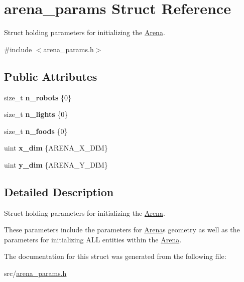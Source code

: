 \hypertarget{structarena__params}{}\section{arena\+\_\+params Struct Reference}
\label{structarena__params}


Struct holding parameters for initializing the \hyperlink{classArena}{Arena}.  




{\ttfamily \#include $<$arena\+\_\+params.\+h$>$}

\subsection*{Public Attributes}
\begin{DoxyCompactItemize}
\item 
size\+\_\+t {\bfseries n\+\_\+robots} \{0\}\hypertarget{structarena__params_a6ae235113b4a6870d502c913c65ad9a2}{}\label{structarena__params_a6ae235113b4a6870d502c913c65ad9a2}

\item 
size\+\_\+t {\bfseries n\+\_\+lights} \{0\}\hypertarget{structarena__params_a98012558dd0075a9f0df9f38140c5bbd}{}\label{structarena__params_a98012558dd0075a9f0df9f38140c5bbd}

\item 
size\+\_\+t {\bfseries n\+\_\+foods} \{0\}\hypertarget{structarena__params_a4160066249e38b463e638d0f8478a5c1}{}\label{structarena__params_a4160066249e38b463e638d0f8478a5c1}

\item 
uint {\bfseries x\+\_\+dim} \{A\+R\+E\+N\+A\+\_\+\+X\+\_\+\+D\+IM\}\hypertarget{structarena__params_afa86b434ed8ea5a4fe9ae14ae1438e8f}{}\label{structarena__params_afa86b434ed8ea5a4fe9ae14ae1438e8f}

\item 
uint {\bfseries y\+\_\+dim} \{A\+R\+E\+N\+A\+\_\+\+Y\+\_\+\+D\+IM\}\hypertarget{structarena__params_ab5d50b9affa9c753c15e1d6f088824af}{}\label{structarena__params_ab5d50b9affa9c753c15e1d6f088824af}

\end{DoxyCompactItemize}


\subsection{Detailed Description}
Struct holding parameters for initializing the \hyperlink{classArena}{Arena}. 

These parameters include the parameters for \hyperlink{classArena}{Arena}\textquotesingle{}s geometry as well as the parameters for initializing A\+LL entities within the \hyperlink{classArena}{Arena}. 

The documentation for this struct was generated from the following file\+:\begin{DoxyCompactItemize}
\item 
src/\hyperlink{arena__params_8h}{arena\+\_\+params.\+h}\end{DoxyCompactItemize}
